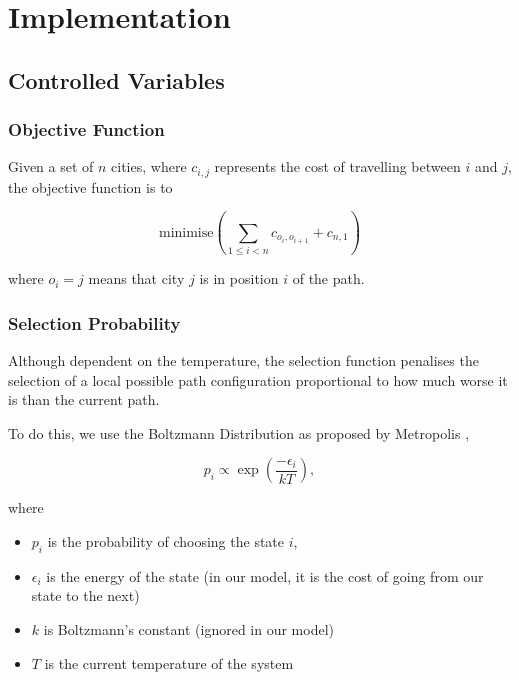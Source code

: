 \documentclass{article}
\begin{document}
\section{Implementation}

\subsection{Controlled Variables}

\subsubsection{Objective Function}

Given a set of $n$ cities, where $c_{i,j}$ represents the cost of travelling between $i$ and $j$, the objective function is to

$$\text{minimise}\left( \sum_{1 \leq i < n} c_{o_i, o_{i + 1}} + c_{n, 1}\right)$$

where $o_i = j$ means that city $j$ is in position $i$ of the path.
\\

\subsubsection{Selection Probability}

Although dependent on the temperature, the selection function penalises the selection of a local possible path configuration proportional to how much worse it is than the current path.

To do this, we use the Boltzmann Distribution as proposed by Metropolis \cite{metropolis},

$$p_i \propto \exp \left( \frac{- \epsilon_i}{kT} \right),$$

where
\begin{itemize}
    \item $p_i$ is the probability of choosing the state $i$,
    \item $\epsilon_i$ is the energy of the state (in our model, it is the cost of going from our state to the next)
    \item $k$ is Boltzmann's constant (ignored in our model)
    \item $T$ is the current temperature of the system
\end{itemize}
\end{document}
